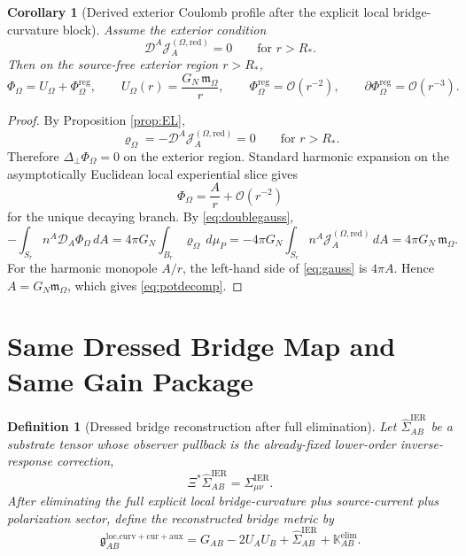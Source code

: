 \documentclass[11pt]{article}
\newcommand{\BridgeMetric}{\mathfrak g}
\newcommand{\ObserverMap}{\Xi}
\newcommand{\SpatialD}{\mathcal D}
\newcommand{\LapPerp}{\Delta_\perp}
\newcommand{\FlowPot}{\Phi_\Omega}
\newcommand{\FlowPotReg}{\Phi_\Omega^{\mathrm{reg}}}
\newcommand{\CoulPot}{U_\Omega}
\newcommand{\SourceDensity}{\varrho_\Omega}
\newcommand{\SourceCurrentRed}{\mathcal J^{(\Omega,\mathrm{red})}}
\newcommand{\HamChargeOmega}{\mathfrak m_\Omega}
\newcommand{\SigmaIER}{\Sigma^{\mathrm{IER}}}
\newcommand{\LiftIER}{\widehat\Sigma^{\mathrm{IER}}}
\newcommand{\AuxPol}{\mathbb K}
\newtheorem{definition}{Definition}
\newtheorem{corollary}{Corollary}
\begin{document}
\begin{corollary}[Derived exterior Coulomb profile after the explicit local bridge-curvature block]
\label{cor:coulomb}
Assume the exterior condition
\begin{equation}
\SpatialD^A\SourceCurrentRed_A=0
\qquad
\text{for } r>R_\ast.
\label{eq:exteriorcurrent}
\end{equation}
Then on the source-free exterior region \(r>R_\ast\),
\begin{equation}
\FlowPot
=
\CoulPot+\FlowPotReg,
\qquad
\CoulPot(r)=\frac{G_N\,\HamChargeOmega}{r},
\qquad
\FlowPotReg=\mathcal O(r^{-2}),
\qquad
\partial\FlowPotReg=\mathcal O(r^{-3}).
\label{eq:potdecomp}
\end{equation}
\end{corollary}

\begin{proof}
By Proposition \ref{prop:EL},
\[
\SourceDensity
=
-\SpatialD^A\SourceCurrentRed_A
=
0
\qquad
\text{for } r>R_\ast.
\]
Therefore \(\LapPerp\FlowPot=0\) on the exterior region. Standard harmonic expansion on the asymptotically Euclidean local experiential slice gives
\[
\FlowPot=\frac{A}{r}+\mathcal O(r^{-2})
\]
for the unique decaying branch. By \eqref{eq:doublegauss},
\begin{equation}
-\int_{S_r}n^A\SpatialD_A\FlowPot\,dA
=
4\pi G_N\int_{B_r}\SourceDensity\,d\mu_P
=
-4\pi G_N\int_{S_r}n^A\SourceCurrentRed_A\,dA
=
4\pi G_N\,\HamChargeOmega.
\label{eq:gauss}
\end{equation}
For the harmonic monopole \(A/r\), the left-hand side of \eqref{eq:gauss} is \(4\pi A\). Hence \(A=G_N\HamChargeOmega\), which gives \eqref{eq:potdecomp}.
\end{proof}

\section{Same Dressed Bridge Map and Same Gain Package}

\begin{definition}[Dressed bridge reconstruction after full elimination]
\label{def:bridge}
Let \(\LiftIER_{AB}\) be a substrate tensor whose observer pullback is the already-fixed lower-order inverse-response correction,
\begin{equation}
\ObserverMap^\ast\LiftIER_{AB}=\SigmaIER_{\mu\nu}.
\label{eq:liftier}
\end{equation}
After eliminating the full explicit local bridge-curvature plus source-current plus polarization sector, define the reconstructed bridge metric by
\begin{equation}
\BridgeMetric_{AB}^{\mathrm{loc.curv+cur+aux}}
=
G_{AB}
-2U_AU_B
+\LiftIER_{AB}
+\AuxPol_{AB}^{\mathrm{elim}}.
\label{eq:bridge}
\end{equation}
\end{definition}
\end{document}
